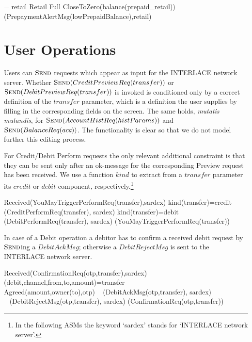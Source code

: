 \begin{asm}
=\+
  \FORALL  retail  \in Retail \cup Full \+
     \IF CloseToZero(balance(prepaid_{retail}))  \THEN \+
        (PrepaymentAlertMsg(lowPrepaidBalance),\TO retail)
\end{asm}
\section{User Operations}
\label{sect:usrops}
Users can $\hbox{\sc Send}$ requests which appear as input for the INTERLACE network server. Whether $\hbox{\sc Send}(CreditPreviewReq(transfer))$ or $\hbox{\sc Send}(DebitPreviewReq(transfer))$ is invoked is conditioned only by a correct definition of the $transfer$ parameter, which is a definition the user supplies by filling in the corresponding  fields on the screen. The same holds, \emph{mutatis mutandis}, for $\hbox{\sc Send}(AccountHistReq(histParams))$ and $\hbox{\sc Send}(BalanceReq(acc))$. The functionality is clear so that we do not model further this editing process.

For Credit/Debit Perform requests the only relevant additional constraint is that they can be sent only after an ok-message for the corresponding Preview request has been received. We use a function $kind$ to extract from a $transfer$ parameter its $credit$ or $debit$ component, respectively.\footnote{In the following ASMs the keyword `sardex' stands for `INTERLACE network server'.}

\begin{asm}
\IF Received(YouMayTriggerPerformReq(transfer),\FROM sardex) \THEN \+
\IF kind(transfer)=credit \THEN \+
(CreditPerformReq(transfer), \TO  sardex) \-
\IF kind(transfer)=debit \THEN \+
(DebitPerformReq(transfer), \TO  sardex)  \-
(YouMayTriggerPerformReq(transfer))
\end{asm}

In case of a Debit operation a debitor has to confirm a received debit request by $\hbox{\sc Send}$ing a $DebitAckMsg$; otherwise a $DebitRejectMsg$ is sent to the INTERLACE network server.
\begin{asm}
\IF Received(ConfirmationReq(otp,transfer),\FROM sardex) \THEN \+
\LET (debit,channel,from,to,amount)=transfer \\
\IF Agreed(amount,owner(to),otp)\+
\THEN ~ (DebitAckMsg(otp,transfer), \TO sardex) \\
\ELSE ~ (DebitRejectMsg(otp,transfer), \TO sardex)\-
(ConfirmationReq(otp,transfer))
\end{asm}


